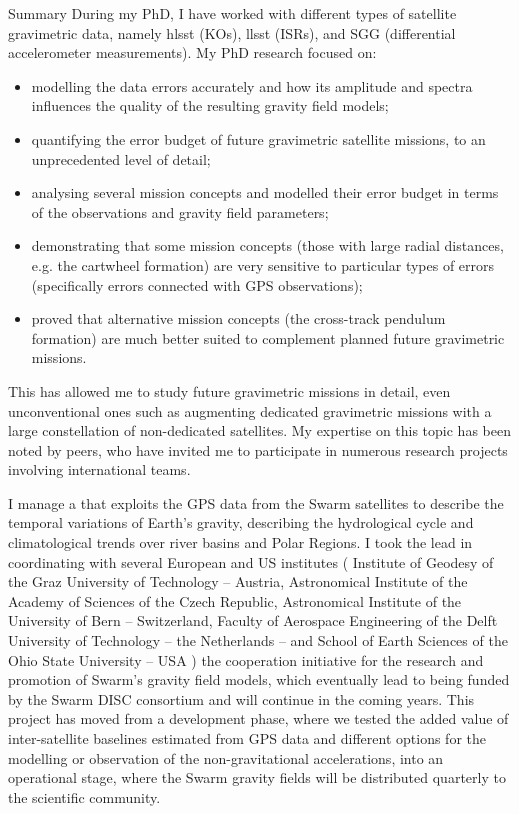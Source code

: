 \begin{cvtext}{Summary}
During my PhD, I have worked with different types of satellite gravimetric data, namely \acl{hlsst} (\aclp{KO}), \acl{llsst} (\aclp{ISR}), and \acl{SGG} (differential accelerometer measurements).
My PhD research focused on:
\begin{itemize}[topsep=0pt,itemsep=1pt,parsep=0pt,partopsep=0pt]
\item modelling the data errors accurately and how its amplitude and spectra influences the quality of the resulting gravity field models;
\item quantifying the error budget of future gravimetric satellite missions, to an unprecedented level of detail;
\item analysing several mission concepts and modelled their error budget in terms of the observations and gravity field parameters;
\item demonstrating that some mission concepts (those with large radial distances, \acs{e.g.} the cartwheel formation) are very sensitive to particular types of errors (specifically errors connected with \ac{GPS} observations); %
\item proved that alternative mission concepts (the cross-track pendulum formation) are much better suited to complement planned future gravimetric missions.%
\end{itemize}
This has allowed me to study future gravimetric missions in detail, even unconventional ones such as augmenting dedicated gravimetric missions with a large constellation of non-dedicated satellites.
My expertise on this topic has been noted by peers, who have invited me to participate in numerous research projects involving international teams.

I manage a  that exploits the \ac{GPS} data from the Swarm satellites to describe the temporal variations of Earth's gravity, describing the hydrological cycle and climatological trends over river basins and Polar Regions.
I took the lead in coordinating with several European and US institutes (%
Institute of Geodesy of the Graz University of Technology -- Austria,
Astronomical Institute of the Academy of Sciences of the Czech Republic, 
Astronomical Institute of the University of Bern -- Switzerland, 
Faculty of Aerospace Engineering of the Delft University of Technology -- the Netherlands -- and 
School of Earth Sciences of the Ohio State University -- USA%
) the cooperation initiative for the research and promotion of Swarm's gravity field models, which eventually lead to being funded by the Swarm \ac{DISC} consortium and will continue in the coming years.
This project has moved from a development phase, where we tested the added value of inter-satellite baselines estimated from GPS data and different options for the modelling or observation of the non-gravitational accelerations, into an operational stage, where the Swarm gravity fields will be distributed quarterly to the scientific community.


\end{cvtext}
